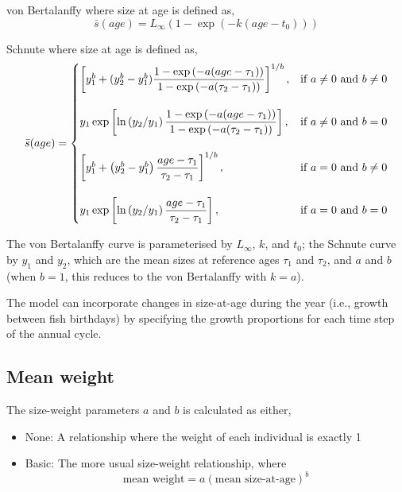 \begin{description}
\item{von Bertalanffy} where size at age is defined as,
\begin{equation} 
\bar{s}(age)= L_\infty \left( 1 - \exp \left( -k \left(age-t_0 \right) \right) \right)
\end{equation}

\item{Schnute} where size at age is defined as,
\begin{equation}
\bar{s}(age)=\displaystyle\begin{cases}
  \left[ y_1^b + (y_2^b - y_1^b) \dfrac{1-\exp \left(-a(age - \tau_1) \right)}{1-\exp \left(-a(\tau_2 - \tau_1) \right)} \right]^{1/b}, & \text{if $a\ne0$ and $b\ne0$} \\
  \AddVspace
  y_1 \exp \left[ \ln \left( y_2 / y_1 \right) \dfrac{1-\exp \left(-a(age - \tau_1) \right)}{1-\exp \left(-a(\tau_2 - \tau_1) \right)} \right], & \text{if $a\ne0$ and $b=0$} \\
  \AddVspace
  \left[ y_1^b + \left( y_2^b - y_1^b \right) \dfrac{age-\tau_1}{\tau_2 - \tau_1} \right]^{1/b}, & \text{if $a=0$ and $b\ne0$} \\
  \AddVspace
  y_1 \exp \left[ \ln \left( y_2/y_1 \right) \dfrac{age-\tau_1}{\tau_2 - \tau_1} \right] , & \text{if $a=0$ and $b=0$} \\
  \end{cases}
\end{equation}
\end{description}

The von Bertalanffy curve is parameterised by $L_\infty$, $k$, and $t_0$; the Schnute curve \citep{836} by $y_1$ and $y_2$, which are the mean sizes at reference ages $\tau_1$ and $\tau_2$, and $a$ and $b$ (when $b=1$, this reduces to the von Bertalanffy with $k=a$). 

The model can incorporate changes in size-at-age during the year (i.e., growth between fish birthdays) by specifying the growth proportions for each time step of the annual cycle.

\subsection{Mean weight\label{sec:mean-weight}}

The size-weight parameters $a$ and $b$ is calculated as either,
\begin{itemize}
  \item{None:} A relationship where the weight of each individual is exactly 1 
  \item{Basic:} The more usual size-weight relationship, where 
  \begin{equation}
    \text{mean weight}=a(\text{mean size-at-age})^b
  \end{equation}
\end{itemize}
  
